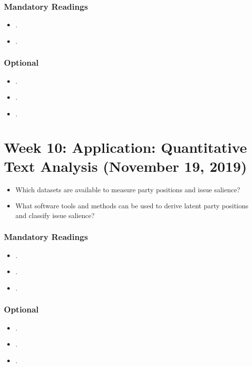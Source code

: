 \documentclass[abstract=on,parskip=full,headings=standardclasses,fontsize=11pt,paper=a4]{scrartcl}
\begin{document}
\subsubsection*{Mandatory Readings}
\begin{itemize}
\item {}.
\item {}.
\end{itemize}


\subsubsection*{Optional}
\begin{itemize}
\item {}.
\item {}.
\item {}.
\end{itemize}


\section{Week 10:   Application: Quantitative Text Analysis (November 19, 2019)}

\begin{itemize}
\renewcommand\labelitemi{--}
\item Which datasets are available to measure party positions and issue salience?
\item What software tools and methods can be used to derive latent party positions and classify issue salience?
\end{itemize}


\subsubsection*{Mandatory Readings}
\begin{itemize}
\item {}.
\item {}.
\item {}.
\end{itemize}


\subsubsection*{Optional}
\begin{itemize}
\item {}.
\item {}.
\item {}.
\end{itemize}
\end{document}
